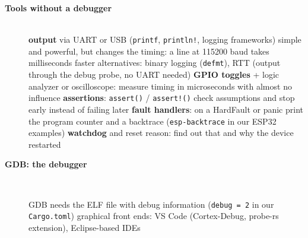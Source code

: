 \begin{description}
\item[{\rot\bf Tools without a debugger}]~\\[-\lblskip]
\bi
	\ite \textbf{output} via UART or USB (\texttt{printf}, \texttt{println!}, logging frameworks)
	\bi
		\ite simple and powerful, but changes the timing: a line at 115200 baud takes milliseconds
		\ite faster alternatives: binary logging (\texttt{defmt}), RTT (output through the debug probe, no UART needed)
	\ei
	\ite \textbf{GPIO toggles} + logic analyzer or oscilloscope: measure timing in microseconds with almost no influence
	\ite \textbf{assertions}: \texttt{assert()} / \texttt{assert!()} check assumptions and stop early instead of failing later
	\ite \textbf{fault handlers}: on a HardFault or panic print the program counter and a backtrace (\texttt{esp-backtrace} in our ESP32 examples)
	\ite \textbf{watchdog} and reset reason: find out that and why the device restarted
\ei
\os{\newpage}

\item[{\rot\bf GDB: the debugger}]~\\[-\lblskip]
\begin{center}
\end{center}
\bi
	\ite GDB needs the ELF file with debug information (\texttt{debug = 2} in our \texttt{Cargo.toml})
	\ite graphical front ends: VS Code (Cortex-Debug, probe-rs extension), Eclipse-based IDEs
\ei
\os{\newpage}


\end{description}

